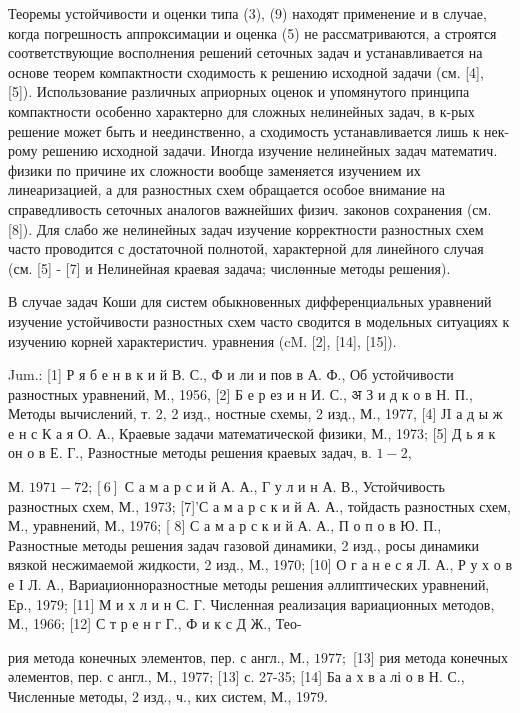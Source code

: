 \documentclass[10pt]{article}
\begin{document}
Теоремы устойчивости и оценки типа (3), (9) находят применение и в случае, когда погрешность аппроксимации и оценка (5) не рассматриваются, а строятся соответствующие восполнения решений сеточных задач и устанавливается на основе теорем компактности сходимость к решению исходной задачи (см. [4], [5]). Использование различных априорных оценок и упомянутого принципа компактности особенно характерно для сложных нелинейных задач, в к-рых решение может быть и неединственно, а сходимость устанавливается лишь к нек-рому решению исходной задачи. Иногда изучение нелинейных задач математич. физики по причине их сложности вообще заменяется изучением их линеаризацией, а для разностных схем обращается особое внимание на справедливость сеточных аналогов важнейших физич. законов сохранения (см. [8]). Для слабо же нелинейных задач изучение корректности разностных схем часто проводится с достаточной полнотой, характерной для линейного случая (см. [5] - [7] и Нелинейная краевая задача; числөнные методы решения).



В случае задач Коши для систем обыкновенных дифференциальных уравнений изучение устойчивости разностных схем часто сводится в модельных ситуациях к изучению корней характеристич. уравнения (cM. [2], [14], [15]).



Jum.: [1] Р я б е н в к и й В. С., Ф и ли и пов в А. Ф., Об устойчивости разностных уравнений, М., 1956, [2] Б е р ез и н И. С., अ З и д к о в Н. П., Методы вычислений, т. 2, 2 изд., ностные схемы, 2 изд., М., 1977, [4] ЈI а д ы ж е н с К а я О. А., Краевые задачи математической физики, М., 1973; [5] Д ь я к он о в Е. Г., Разностные методы решения краевых задач, в. $1-2$,

М. $1971-72 ;[6]$ С а м а р с и й А. А., Г у л и н А. В., Устойчивость разностных схем, М., 1973; [7]'С а м а р с к и й А. А., тойдасть разностных схем, М., уравнений, М., 1976; [ 8] С а м а р с к и й А. А., П о п о в Ю. П., Разностные методы решения задач газовой динамики, 2 изд., росы динамики вязкой несжимаемой жидкости, 2 изд., М., 1970; [10] О г а н е с я Л. А., Р у х о в е І Л. А., Вариаџионноразностные методы решения әллиптических уравнений, Ер., 1979; [11] М и х л и н С. Г. Численная реализация вариационных методов, М., 1966; [12] С т р е н г Г., Ф и к с Д Ж., Тео-

рия метода конечных элементов, пер. с англ., М., $1977 ;$ [13] рия метода конечных әлементов, пер. с англ., М., 1977; [13] с. 27-35; [14] Ба а х в а лі о в Н. С., Численные методы, 2 изд., ч., ких систем, М., 1979.
\end{document}
